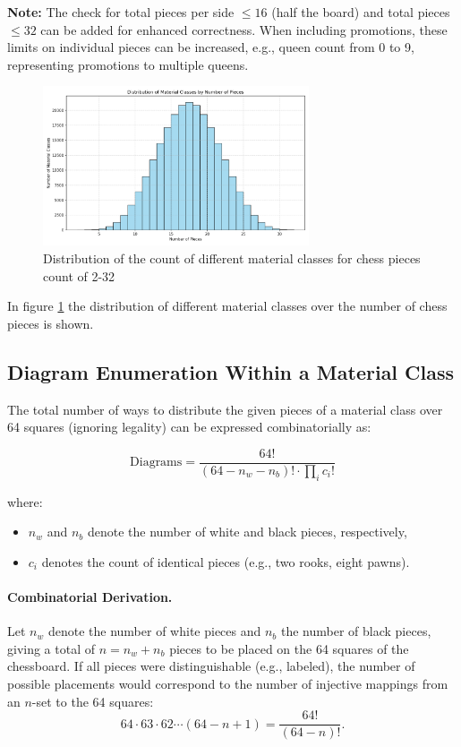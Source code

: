 \documentclass[12pt]{article}
\begin{document}
\noindent
\textbf{Note:} The check for total pieces per side $\leq 16$ (half the board) and total
pieces $\leq 32$ can be added for enhanced correctness. When including promotions, 
these limits on individual pieces can be increased, e.g., queen count
from 0 to 9, representing promotions to multiple queens.

\begin{figure}[h!]
  \centering
  \includegraphics[width=0.7\textwidth]{material_class_histogram.png}
  \caption{Distribution of the count of different material classes for chess pieces count of 2-32}
  \label{fig:material_class_hist}
\end{figure}
In figure \ref{fig:material_class_hist} the distribution of different material classes over the number of chess pieces is shown.
\subsection{Diagram Enumeration Within a Material Class}

The total number of ways to distribute the given pieces of a material class over 64 squares (ignoring legality) can be expressed combinatorially as:

\[
\text{Diagrams} = \frac{64!}{(64 - n_w - n_b)! \cdot \prod_i c_i!}
\]

where:
\begin{itemize}
\item $n_w$ and $n_b$ denote the number of white and black pieces, respectively,
\item $c_i$ denotes the count of identical pieces (e.g., two rooks, eight pawns).
\end{itemize}

\paragraph{Combinatorial Derivation.}
Let \(n_w\) denote the number of white pieces and \(n_b\) the number of black pieces, giving a total of \(n = n_w + n_b\) pieces to be placed on the 64 squares of the chessboard.  
If all pieces were distinguishable (e.g., labeled), the number of possible placements would correspond to the number of injective mappings from an \(n\)-set to the 64 squares:
\[
64 \cdot 63 \cdot 62 \cdots (64 - n + 1) = \frac{64!}{(64 - n)!}.
\]
\end{document}
